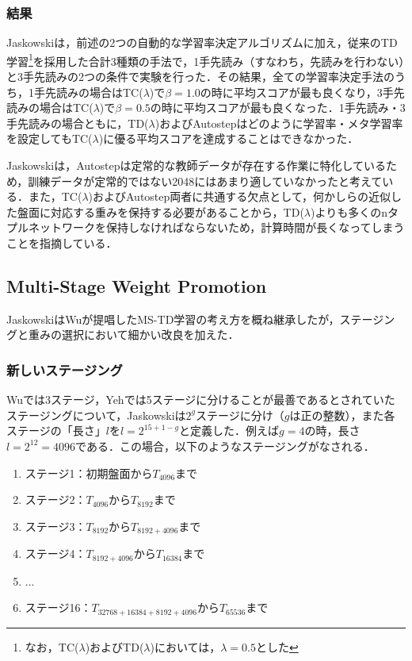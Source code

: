 \documentclass{suribt}
\begin{document}
\subsubsection{結果}
Jaskowskiは，前述の2つの自動的な学習率決定アルゴリズムに加え，従来のTD学習\footnote{なお，TC(${\lambda}$)およびTD(${\lambda}$)においては，${\lambda}=0.5$とした}を採用した合計3種類の手法で，1手先読み（すなわち，先読みを行わない）と3手先読みの2つの条件で実験を行った．その結果，全ての学習率決定手法のうち，1手先読みの場合はTC(${\lambda}$)で${\beta}=1.0$の時に平均スコアが最も良くなり，3手先読みの場合はTC(${\lambda}$)で${\beta}=0.5$の時に平均スコアが最も良くなった．1手先読み・3手先読みの場合ともに，TD(${\lambda}$)およびAutostepはどのように学習率・メタ学習率を設定してもTC(${\lambda}$)に優る平均スコアを達成することはできなかった．

Jaskowskiは，Autostepは定常的な教師データが存在する作業に特化しているため，訓練データが定常的ではない2048にはあまり適していなかったと考えている．また，TC(${\lambda}$)およびAutostep両者に共通する欠点として，何かしらの近似した盤面に対応する重みを保持する必要があることから，TD(${\lambda}$)よりも多くのnタプルネットワークを保持しなければならないため，計算時間が長くなってしまうことを指摘している．

\subsection{Multi-Stage Weight Promotion}
JaskowskiはWuが提唱したMS-TD学習の考え方を概ね継承したが，ステージングと重みの選択において細かい改良を加えた．

\subsubsection{新しいステージング}
Wuでは3ステージ，Yehでは5ステージに分けることが最善であるとされていたステージングについて，Jaskowskiは$2^g$ステージに分け（$g$は正の整数），また各ステージの「長さ」$l$を$l = 2^{15+1-g}$と定義した．例えば$g=4$の時，長さ$l=2^{12}=4096$である．この場合，以下のようなステージングがなされる．

\begin{enumerate}
\item ステージ1：初期盤面から$T_{4096}$まで
\item ステージ2：$T_{4096}$から$T_{8192}$まで
\item ステージ3：$T_{8192}$から$T_{8192+4096}$まで
\item ステージ4：$T_{8192+4096}$から$T_{16384}$まで
\item ...
\item ステージ16：$T_{32768+16384+8192+4096}$から$T_{65536}$まで
\end{enumerate}
\end{document}

